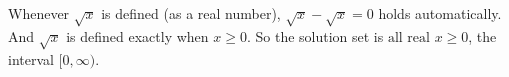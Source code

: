 Whenever $\sqrt x$ is defined (as a real number), $\sqrt x-\sqrt x=0$ holds automatically. And $\sqrt x$ is defined exactly when $x\ge0$. So the solution set is $\boxed{\text{all real }x\ge0}$, the interval $[0,\infty)$.
